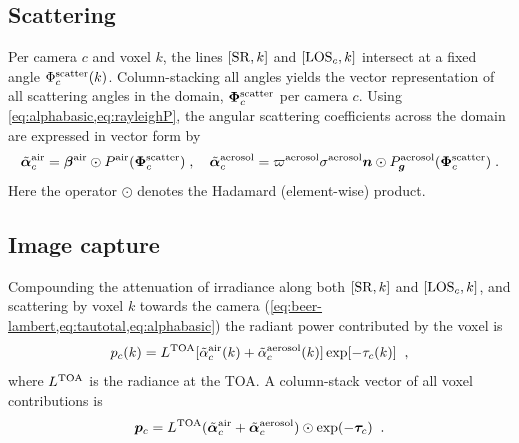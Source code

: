 \documentclass[10pt,letterpaper]{article}
\newcommand{\vect}[1]{\bm{#1}}
\begin{document}
\subsection{Scattering}
\label{sec:scattering}

Per camera $c$ and voxel $k$, the lines $[{\rm SR},k]$ and $[{\rm
  LOS}_c,k]$ intersect at a fixed angle $\Phi^{\rm scatter}_c(k)$.
Column-stacking all angles yields the vector representation of all
scattering angles in the domain, $\vect{\Phi}^{\rm scatter}_c$ per
camera $c$.
Using \cref{eq:alphabasic,eq:rayleighP}, the angular scattering
coefficients across the domain are expressed in vector form by
\begin{equation}
  \tilde{\vect{\alpha}}^{\rm air}_c =
  \vect{\beta}^{\rm air} \odot P^{\rm air}(\vect{\Phi}^{\rm scatter}_c)\;,
  \quad
  \tilde{\vect{\alpha}}^{\rm aerosol}_c =
  \varpi^{\rm aerosol} \sigma^{\rm aerosol}
  {\bm n} \odot P^{\rm aerosol}_{\bm g}(\vect{\Phi}^{\rm scatter}_c) \;.
  \label{eq:alpha_matrix}
\end{equation}
Here the operator $\odot$ denotes the Hadamard (element-wise) product.


\subsection{Image capture}
\label{sec:captured-image}

Compounding the attenuation of irradiance along both $[{\rm SR},k]$
and $[{\rm LOS}_c,k]$, and scattering by voxel $k$ towards the camera
(\cref{eq:beer-lambert,eq:tautotal,eq:alphabasic}) the radiant power
contributed by the voxel is
\begin{equation}
  p_c(k)= L^{\rm TOA}
  [\tilde{\alpha}^{\rm air}_c(k) + \tilde{\alpha}^{\rm aerosol}_c(k)]
  \exp[-\tau_c(k)]
  \;\;,
  \label{eq:ick}
\end{equation}
where $L^{\rm TOA}$ is the radiance at the TOA. A column-stack vector
of all voxel contributions is
\begin{equation}
  {\bm p}_c= L^{\rm TOA}
  (\tilde{\vect{\alpha}}^{\rm air}_c + \tilde{\vect{\alpha}}^{\rm aerosol}_c)
  \odot \exp(-\vect{\tau}_c)
  \;\;.
  \label{eq:pc}
\end{equation}
\end{document}

